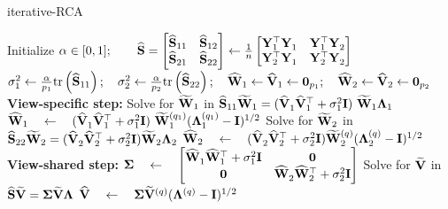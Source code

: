       \begin{algorithm}
        \caption{iterative-RCA} \label{alg:iterativeRCA}
        \begin{algorithmic}
          \STATE
          \STATE Initialize $\alpha \in [0,1]; \qquad \widehat{\mathbf{S}} = \begin{bmatrix}  \widehat{\mathbf{S}}_{11} & \widehat{\mathbf{S}}_{12} \\ \widehat{\mathbf{S}}_{21} & \widehat{\mathbf{S}}_{22}  \end{bmatrix} \leftarrow \frac{1}{n} \begin{bmatrix}  \mathbf{Y}_1^\top \mathbf{Y}_1^{} & \mathbf{Y}_1^\top \mathbf{Y}_2^{} \\ \mathbf{Y}_2^\top \mathbf{Y}_1^{} & \mathbf{Y}_2^\top \mathbf{Y}_2^{}  \end{bmatrix}$
          \STATE
          \STATE $\sigma^2_1 \leftarrow \frac{\alpha}{p_1} \textrm{tr} \left( \widehat{\mathbf{S}}_{11} \right); \quad \sigma^2_2 \leftarrow \frac{\alpha}{p_2} \textrm{tr} \left( \widehat{\mathbf{S}}_{22} \right); \quad  \widehat{\mathbf{W}}_1 \leftarrow \widehat{\mathbf{V}}_1 \leftarrow \mathbf{0}_{p_1}; \quad \widehat{\mathbf{W}}_2 \leftarrow \widehat{\mathbf{V}}_2 \leftarrow \mathbf{0}_{p_2}$
          \STATE
          \REPEAT
            \STATE \textbf{View-specific step:}
            \STATE \quad Solve for \quad $\widetilde{\mathbf{W}}_1$ \quad in \quad $ \widehat{\mathbf{S}}_{11} \widetilde{\mathbf{W}}_1 = (\widehat{\mathbf{V}}_1^{} \widehat{\mathbf{V}}_1^\top + \sigma^2_1 \mathbf{I})~ \widetilde{\mathbf{W}}_1 \mathbf{\Lambda}_1$
            \STATE \quad $\widehat{\mathbf{W}}_1 \quad \leftarrow \quad (\widehat{\mathbf{V}}_1^{} \widehat{\mathbf{V}}_1^\top + \sigma^2_1 \mathbf{I})~ \widetilde{\mathbf{W}}_{1}^{(q_1)} (\mathbf{\Lambda}_{1}^{(q_1)} - \mathbf{I})^{1/2}$
            \STATE
            \STATE \quad Solve for \quad $\widetilde{\mathbf{W}}_2$ \quad in \quad $ \widehat{\mathbf{S}}_{22} \widetilde{\mathbf{W}}_2 = (\widehat{\mathbf{V}}_2^{} \widehat{\mathbf{V}}_2^\top + \sigma^2_2 \mathbf{I}) \widetilde{\mathbf{W}}_2 \mathbf{\Lambda}_2$
            \STATE \quad $\widehat{\mathbf{W}}_2 \quad \leftarrow \quad (\widehat{\mathbf{V}}_2^{} \widehat{\mathbf{V}}_2^\top + \sigma^2_2\mathbf{I}) \widetilde{\mathbf{W}}_{2}^{(q)} ( \mathbf{\Lambda}_{2}^{(q)} - \mathbf{I})^{1/2}$
            \STATE
            \STATE \textbf{View-shared step:}
            \STATE \quad $\mathbf{\Sigma} \quad \leftarrow \quad  \begin{bmatrix}  \widehat{\mathbf{W}}_1^{} \widehat{\mathbf{W}}_1^\top + \sigma^2_1 \mathbf{I} & \mathbf{0} \\ \mathbf{0} & \widehat{\mathbf{W}}_2^{} \widehat{\mathbf{W}}_2^\top + \sigma^2_2\mathbf{I}  \end{bmatrix}$
            \STATE
            \STATE \quad Solve for \quad $\widetilde{\mathbf{V}}$ \quad in \quad $\widehat{\mathbf{S}} \widetilde{\mathbf{V}} = \mathbf{\Sigma} \widetilde{\mathbf{V}} \mathbf{\Lambda}$
            \STATE \quad $\widehat{\mathbf{V}} \quad \leftarrow \quad \mathbf{\Sigma} \widetilde{\mathbf{V}}^{(q)} (\mathbf{\Lambda}^{(q)} - \mathbf{I})^{1/2}$
            \STATE
        \end{algorithmic}
      \end{algorithm}
        
